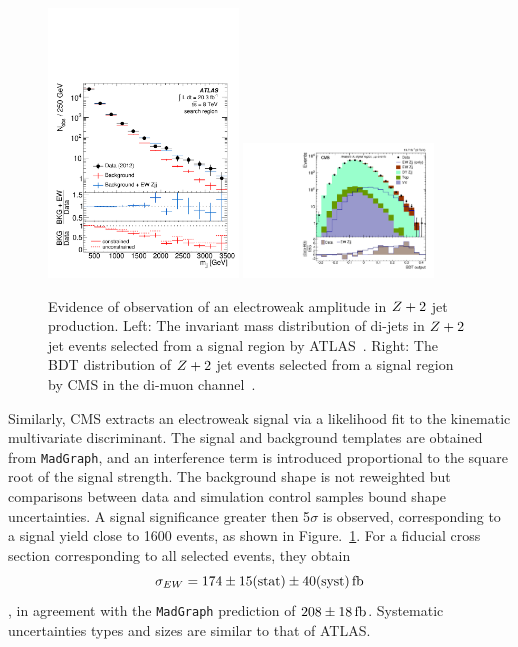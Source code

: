 \begin{figure}[p]
    \centering
    \includegraphics[width=0.45\textwidth]{figures/ss-exclboson-z2j-atlas8tev.pdf}
    \includegraphics[width=0.45\textwidth]{figures/ss-exclboson-z2j-cms8tev.pdf}
    \caption{Evidence of observation of an electroweak amplitude in $Z+2$ jet production.
    Left:  The invariant mass distribution of di-jets in $Z+2$ jet events selected
     from a signal region by ATLAS~\cite{Aad:2014dta}.
    Right:  The BDT distribution of $Z+2$ jet events selected from a signal region
    by CMS in the di-muon channel~\cite{Khachatryan:2014dea}.}
    \label{fig:ss-exclboson-z2j-8tev}
\end{figure}

Similarly, CMS extracts an electroweak signal via a likelihood fit to the kinematic multivariate discriminant.  The signal and background
templates are obtained from \texttt{MadGraph}, and an interference term is introduced proportional to the square root of the signal strength.
The background shape is not reweighted but comparisons between data and simulation control samples bound shape uncertainties.  A signal significance
greater then 5$\sigma$ is observed, corresponding to a signal yield close to 1600 events, as shown in Figure.~\ref{fig:ss-exclboson-z2j-8tev}.
For a fiducial cross section corresponding to all selected events, they obtain
$$\sigma_{EW} = 174 \pm 15 \rm{(stat)} \pm 40 \rm{(syst)} \rm{\,fb}$$,
in agreement with the \texttt{MadGraph} prediction of $208 \pm 18 \rm{\,fb}$.  Systematic uncertainties types and sizes are similar to that of ATLAS.
